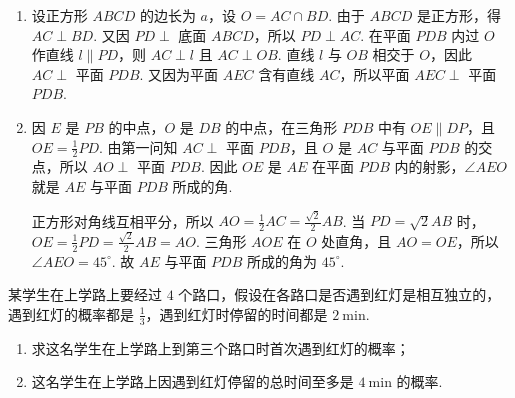 \begin{solution}
\begin{enumerate}
\item 设正方形 \(ABCD\) 的边长为 \(a\)，设 \(O=AC\cap BD\). 由于 \(ABCD\) 是正方形，得 \(AC\perp BD\).
又因 \(PD\perp\) 底面 \(ABCD\)，所以 \(PD\perp AC\).
在平面 \(PDB\) 内过 \(O\) 作直线 \(l\parallel PD\)，则 \(AC\perp l\) 且 \(AC\perp OB\).
直线 \(l\) 与 \(OB\) 相交于 \(O\)，因此 \(AC\perp\) 平面 \(PDB\).
又因为平面 \(AEC\) 含有直线 \(AC\)，所以平面 \(AEC\perp\) 平面 \(PDB\).

\item 因 \(E\) 是 \(PB\) 的中点，\(O\) 是 \(DB\) 的中点，在三角形 \(PDB\) 中有 \(OE\parallel DP\)，且 \(OE=\frac{1}{2}PD\).
由第一问知 \(AC\perp\) 平面 \(PDB\)，且 \(O\) 是 \(AC\) 与平面 \(PDB\) 的交点，所以 \(AO\perp\) 平面 \(PDB\).
因此 \(OE\) 是 \(AE\) 在平面 \(PDB\) 内的射影，\(\angle AEO\) 就是 \(AE\) 与平面 \(PDB\) 所成的角.

正方形对角线互相平分，所以 \(AO=\frac{1}{2}AC=\frac{\sqrt{2}}{2}AB\).
当 \(PD=\sqrt{2}AB\) 时，\(OE=\frac{1}{2}PD=\frac{\sqrt{2}}{2}AB=AO\).
三角形 \(AOE\) 在 \(O\) 处直角，且 \(AO=OE\)，所以 \(\angle AEO=45^{\circ}\).
故 \(AE\) 与平面 \(PDB\) 所成的角为 \(45^{\circ}\).
\end{enumerate}
\end{solution}

\begin{problem}
某学生在上学路上要经过 \(4\) 个路口，假设在各路口是否遇到红灯是相互独立的，遇到红灯的概率都是 \(\frac{1}{3}\)，遇到红灯时停留的时间都是 \(2 \mathrm{~min}\).
\begin{enumerate}
\item 求这名学生在上学路上到第三个路口时首次遇到红灯的概率；
\item 这名学生在上学路上因遇到红灯停留的总时间至多是 \(4 \mathrm{~min}\) 的概率.
\end{enumerate}

\end{problem}

